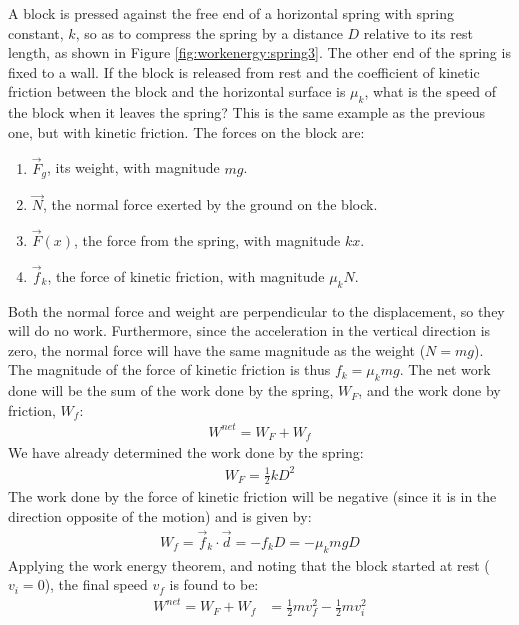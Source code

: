 \begin{example}{A block is pressed against the free end of a horizontal spring with spring constant, $k$, so as to compress the spring by a distance $D$ relative to its rest length, as shown in Figure \ref{fig:workenergy:spring3}. The other end of the spring is fixed to a wall. 
If the block is released from rest and the coefficient of kinetic friction between the block and the horizontal surface is $\mu_k$, what is the speed of the block when it leaves the spring?} This is the same example as the previous one, but with kinetic friction. The forces on the block are:
\begin{enumerate}
\item $\vec F_g$, its weight, with magnitude $mg$.
\item $\vec N$, the normal force exerted by the ground on the block.
\item $\vec F(x)$, the force from the spring, with magnitude $kx$. 
\item $\vec f_k$, the force of kinetic friction, with magnitude $\mu_kN$.
\end{enumerate}
Both the normal force and weight are perpendicular to the displacement, so they will do no work. Furthermore, since the acceleration in the vertical direction is zero, the normal force will have the same magnitude as the weight ($N=mg$). The magnitude of the force of kinetic friction is thus $f_k = \mu_k mg$. The net work done will be the sum of the work done by the spring, $W_F$, and the work done by friction, $W_f$:
\begin{align*}
W^{net} = W_F + W_f
\end{align*}
We have already determined the work done by the spring:
\begin{align*}
W_F = \frac{1}{2}kD^2
\end{align*}
The work done by the force of kinetic friction will be negative (since it is in the direction opposite of the motion) and is given by:
\begin{align*}
W_f = \vec f_k \cdot \vec d = -f_kD = -\mu_kmgD
\end{align*}
Applying the work energy theorem, and noting that the block started at rest ($v_i=0$), the final speed $v_f$ is found to be:
\begin{align*}
W^{net} =W_F + W_f&= \frac{1}{2}mv_f^2 - \frac{1}{2}mv_i^2 \\

\end{align*}
\end{example}
